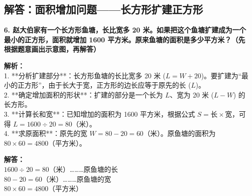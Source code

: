 \newpage

\subsection{解答：面积增加问题——长方形扩建正方形}

\vspace{0.4cm}

\noindent\textbf{6. 赵大伯家有一个长方形鱼塘，长比宽多 20 米。如果把这个鱼塘扩建成为一个最小的正方形，面积就增加 1600 平方米。原来鱼塘的面积是多少平方米？（先根据题意画出示意图，再解答）}

\vspace{0.8cm}

\begin{center}
\end{center}

\vspace{0.6cm}

{\small\color{gray}
\textbf{解析：}\\
1. **分析扩建部分**：长方形鱼塘的长比宽多 20 米 ($L = W + 20$)。要扩建为“最小的正方形”，由于长大于宽，正方形的边长应等于原先的长 ($L$)。\\
2. **确定增加面积的形状**：扩建的部分是一个长为 $L$、宽为 20 米 ($L - W$) 的长方形。\\
3. **计算长和宽**：已知增加的面积为 1600 平方米，根据公式 $S = \text{长} \times \text{宽}$，可得 $L = 1600 \div 20 = 80$（米）。\\
4. **求原面积**：原先的宽 $W = 80 - 20 = 60$（米）。原鱼塘的面积为 $80 \times 60 = 4800$（平方米）。
}

\vspace{0.4cm}
\noindent\textbf{解答：}\\
\indent $1600 \div 20 = 80$（米）\dots\dots\dots 原鱼塘的长\\
\indent $80 - 20 = 60$（米）\dots\dots\dots 原鱼塘的宽\\
\indent $80 \times 60 = 4800$（平方米）

